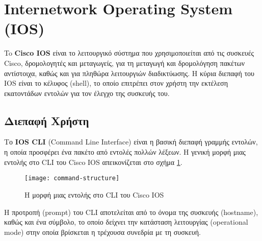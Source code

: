 \documentclass{EdipyLabs} %
\begin{document}
\Initialize

\section{Internetwork Operating System (IOS)}
To \textbf{Cisco IOS} είναι το λειτουργικό σύστημα που χρησιμοποιείται από τις συσκευές Cisco, δρομολογητές και μεταγωγείς, για τη μεταγωγή και δρομολόγηση πακέτων αντίστοιχα, καθώς και για πληθώρα λειτουργιών διαδικτύωσης. Η κύρια διεπαφή του IOS είναι το κέλυφος (shell), το οποίο επιτρέπει στον χρήστη την εκτέλεση εκατοντάδων εντολών για τον έλεγχο της συσκευής του.

\subsection{Διεπαφή Χρήστη}
Το \textbf{IOS CLI} (Command Line Interface) είναι η βασική διεπαφή γραμμής εντολών, η οποία προσφέρει ένα πακέτο από εντολές πολλών λέξεων. H γενική μορφή μιας εντολής στο CLI του Cisco IOS απεικονίζεται στο σχήμα \ref{fig:command-structure}.

\begin{figure}[H]
	\centering
	\texttt{[image: command-structure]}
	\caption{Η μορφή μιας εντολής στο CLI του Cisco IOS}\label{fig:command-structure}
\end{figure}

Η προτροπή (prompt) του CLI αποτελείται από το όνομα της συσκευής (hostname), καθώς και ένα σύμβολο, το οποίο δείχνει την κατάσταση λειτουργίας (operational mode) στην οποία βρίσκεται η τρέχουσα συνεδρία με τη συσκευή.
\end{document}

